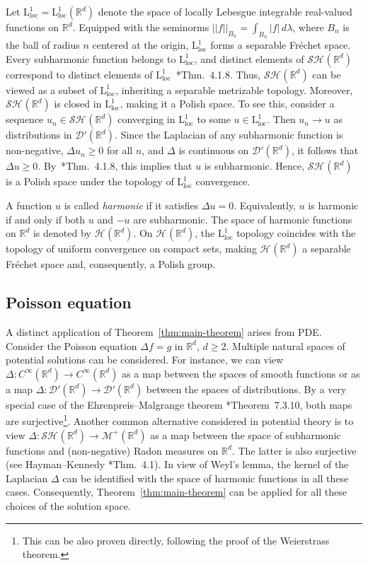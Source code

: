 \documentclass[12pt]{paper}
\numberwithin{equation}{section}
\theoremstyle{plain}
\theoremstyle{definition}
\newcommand{\Rd}{\mathbb{R}^{d}}
\newcommand{\smooth}[2][]{C^{\infty}_{#1}(#2)}
\newcommand{\measp}[2][]{\mathcal{M}_{#1}^+(#2)}
\newcommand{\distrib}[1]{\mathscr{D}'(#1)}
\newcommand{\harm}[2][]{\mathcal{H}_{#1}(#2)}
\newcommand{\sharm}[2][]{\mathcal{SH}_{#1}(#2)}
\newcommand{\lloc}{\mathrm{L^{1}_{\mathrm{loc}}}}
\newcommand{\norm}[1]{||#1||}
\begin{document}
Let \(\lloc = \lloc(\Rd)\) denote the space of locally Lebesgue integrable real-valued functions on
\(\Rd\).  Equipped with the seminorms \(\norm{f}_{B_{n}} = \int_{B_{n}} |f|\, d\lambda\), where
\(B_{n}\) is the ball of radius \(n\) centered at the origin, \(\lloc\) forms a separable Fr\'echet
space. Every subharmonic function belongs to \(\lloc\), and distinct elements of \(\sharm{\Rd}\)
correspond to distinct elements of \(\lloc\)~\cite{hormanderAnalysisLinearPartial2003}*{Thm.~4.1.8}.
Thus, \(\sharm{\Rd}\) can be viewed as a subset of \(\lloc\), inheriting a separable metrizable
topology.  Moreover, \(\sharm{\Rd}\) is closed in \(\lloc\), making it a Polish space.  To see this,
consider a sequence \(u_{n} \in \sharm{\Rd}\) converging in \(\lloc\) to some \(u \in \lloc\).  Then
\(u_{n} \to u\) as distributions in \(\distrib{\Rd}\).  Since the Laplacian of any subharmonic
function is non-negative, \(\Delta u_{n} \ge 0\) for all \(n\), and \(\Delta\) is continuous on
\(\distrib{\Rd}\), it follows that \(\Delta u \ge
0\). By~\cite{hormanderAnalysisLinearPartial2003}*{Thm.~4.1.8}, this implies that \(u\) is
subharmonic. Hence, \(\sharm{\Rd}\) is a Polish space under the topology of \(\lloc\) convergence.

A function \(u\) is called \emph{harmonic} if it satisfies \(\Delta u = 0\).  Equivalently, \(u\) is
harmonic if and only if both \(u\) and \(-u\) are subharmonic.  The space of harmonic functions on
\(\Rd\) is denoted by \(\harm{\Rd}\).  On \(\harm{\Rd}\), the \(\lloc\) topology coincides with the
topology of uniform convergence on compact sets, making \(\harm{\Rd}\) a separable Fr\'echet space
and, consequently, a Polish group.

\subsection{Poisson equation}
\label{sec:poisson-equation}

A distinct application of Theorem~\ref{thm:main-theorem} arises from PDE.  Consider the Poisson
equation \(\Delta f = g\) in \(\Rd\), \(d \ge 2\).  Multiple natural spaces of potential
solutions can be considered.  For instance, we can view \(\Delta : \smooth{\Rd} \to \smooth{\Rd}\)
as a map between the spaces of smooth functions or as a map
\(\Delta : \distrib{\Rd} \to \distrib{\Rd}\) between the spaces of distributions.  By a very special
case of the Ehrenpreis--Malgrange theorem
\cite{hormanderAnalysisLinearPartial2003}*{Theorem~7.3.10}, both maps are surjective\footnote{This
  can be also proven directly, following the proof of the Weierstrass theorem.}. Another common
alternative considered in potential theory is to view \(\Delta : \sharm{\Rd} \to \measp{\Rd}\) as a
map between the space of subharmonic functions and (non-negative) Radon measures on \(\Rd\).  The
latter is also surjective (see Hayman--Kennedy \cite{haymanSubharmonicFunctionsVol1976}*{Thm.~4.1}).
In view of Weyl's lemma, the kernel of the Laplacian \(\Delta\) can be identified with the space of
harmonic functions in all these cases.  Consequently, Theorem~\ref{thm:main-theorem} can be applied
for all these choices of the solution space.
\end{document}
